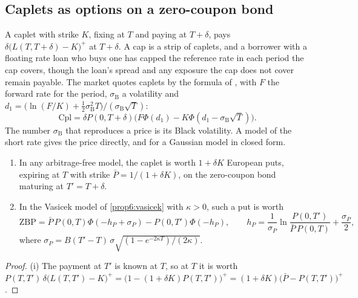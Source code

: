\begin{chapterrefs}
\subsection{Caplets as options on a zero-coupon bond}

A caplet with strike $K$, fixing at $T$ and paying at $T+\delta$, pays
$\delta\bigl(L(T,T+\delta)-K\bigr)^+$ at $T+\delta$. A cap is a strip of caplets, and a borrower
with a floating rate loan who buys one has capped the reference rate in each period the cap covers,
though the loan's spread and any exposure the cap does not cover remain payable. The market quotes
caplets by the formula of \textcite{black1976}, with $F$ the forward rate for the period,
$\sigma_{\mathrm B}$ a volatility and $d_1=\bigl(\ln(F/K)+\tfrac12\sigma_{\mathrm B}^2T\bigr)/(\sigma_{\mathrm B}\sqrt T)$:
\begin{equation}\label{eq6:black}
  \mathrm{Cpl}=\delta P(0,T+\delta)\bigl(F\Phi(d_1)-K\Phi(d_1-\sigma_{\mathrm B}\sqrt T)\bigr).
\end{equation}
The number $\sigma_{\mathrm B}$ that reproduces a price is its Black volatility. A model of the short rate gives the price directly, and for a Gaussian model in closed form.

\begin{proposition}\label{prop6:caplet}
\begin{enumerate}[label=(\roman*)]
  \item In any arbitrage-free model, the caplet is worth $1+\delta K$ European puts, expiring at $T$
  with strike $\bar P=1/(1+\delta K)$, on the zero-coupon bond maturing at $T'=T+\delta$.
  \item In the Vasicek model of \cref{prop6:vasicek} with $\kappa>0$, such a put is worth
  \[
    \mathrm{ZBP}=\bar P\,P(0,T)\Phi(-h_P+\sigma_P)-P(0,T')\Phi(-h_P),\qquad
    h_P=\frac1{\sigma_P}\ln\frac{P(0,T')}{\bar P\,P(0,T)}+\frac{\sigma_P}2,
  \]
  where $\sigma_P=B(T'-T)\,\sigma\sqrt{(1-e^{-2\kappa T})/(2\kappa)}$.
\end{enumerate}
\end{proposition}

\begin{proof}
(i) The payment at $T'$ is known at $T$, so at $T$ it is worth
$P(T,T')\,\delta\bigl(L(T,T')-K\bigr)^+=\bigl(1-(1+\delta K)P(T,T')\bigr)^+=(1+\delta K)\bigl(\bar P-P(T,T')\bigr)^+$.


\end{proof}
\end{chapterrefs}
